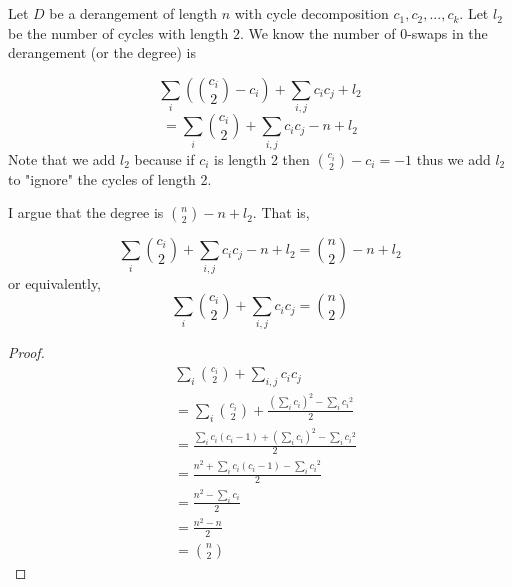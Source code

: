 \documentclass[12pt]{article}
\begin{document}
\maketitle


\section{}

Let $D$ be a derangement of length $n$ with cycle decomposition $c_1, c_2, ..., c_k$.
Let $l_2$ be the number of cycles with length $2$.
We know the number of $0$-swaps in the derangement (or the degree) is

\[
    \sum_{i}{({c_i \choose 2} - c_i)} + \sum_{i, j}{{c_i}{c_j}} + l_2 
\]
\[
    = \sum_{i}{c_i \choose 2} + \sum_{i, j}{{c_i}{c_j}} - n + l_2 
\]
Note that we add $l_2$ because if $c_i$ is length 2 then 
$ {c_i \choose 2} - c_i = -1 $ thus we add $l_2$ to "ignore" the cycles of length 2.

I argue that the degree is ${n \choose 2} - n + l_2$. That is,

\[
    \sum_{i}{c_i \choose 2} + \sum_{i, j}{{c_i}{c_j}} - n + l_2 = {n \choose 2} - n  + l_2
\]
or equivalently,
\[
    \sum_{i}{c_i \choose 2} + \sum_{i, j}{{c_i}{c_j}} = {n \choose 2}
\]

\begin{proof}
        \begin{align}
            & \sum_{i}{c_i \choose 2} + \sum_{i, j}{{c_i}{c_j}}  \\\nonumber
            &=  \sum_{i}{c_i \choose 2} + \frac{(\sum_{i}{c_i})^2 - \sum_{i}{{c_i}^2}}{2} \\\nonumber
            &=  \frac{\sum_{i}{c_i(c_i -1)} + (\sum_{i}{c_i})^2 - \sum_{i}{{c_i}^2}}{2} \\\nonumber
            &=  \frac{n^2 + \sum_{i}{c_i(c_i - 1)} - \sum_{i}{{c_i}^2}}{2} \\\nonumber
            &=  \frac{n^2 - \sum_{i}{c_i}}{2} \\\nonumber
            &=  \frac{n^2 - n}{2} \\\nonumber
            &=  {n \choose 2}
        \end{align}
\end{proof}
\end{document}
